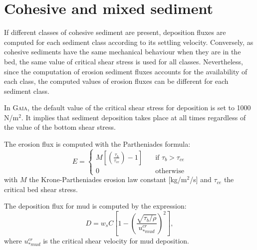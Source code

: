 \section{Cohesive and mixed sediment}
\label{Chap:Sed:Ex:cohesive}
If different classes of cohesive sediment are present, deposition fluxes are computed for each sediment class according to its settling velocity. Conversely, as cohesive sediments have the same mechanical behaviour when they are in the bed, the same value of critical shear stress is used for all classes. Nevertheless, since the computation of erosion sediment fluxes accounts for the availability of each class, the computed values of erosion fluxes can be different for each sediment class.

In \textsc{Gaia}, the default value of the critical shear stress for deposition is set to 1000 N/m$^2$. It implies that sediment deposition takes place at all times regardless of the value of the bottom shear stress.

The erosion flux is computed with the Partheniades formula:
\begin{equation*}
E = \left\{\begin{array}{ll}
M\left[\left(\frac{\tau_b}{\tau_{ce}}\right)-1\right]\quad & \text{if}\,\,\tau_b> \tau_{ce}\\
0\quad & \text{otherwise}
\end{array}
\right.
\end{equation*}
with $M$ the Krone-Partheniades erosion law constant [kg/m$^2$/s] and $\tau_{ce}$ the critical bed shear stress.

The deposition flux for mud is computed by the expression:
\begin{equation}
D = w_{s} C \left[1-\left(\frac{\sqrt{\tau_b/\rho}}{u_{*mud}^{cr}}\right)^2 \right],
\end{equation}
where $u_{*mud}^{cr}$ is the critical shear velocity for mud deposition.\\

